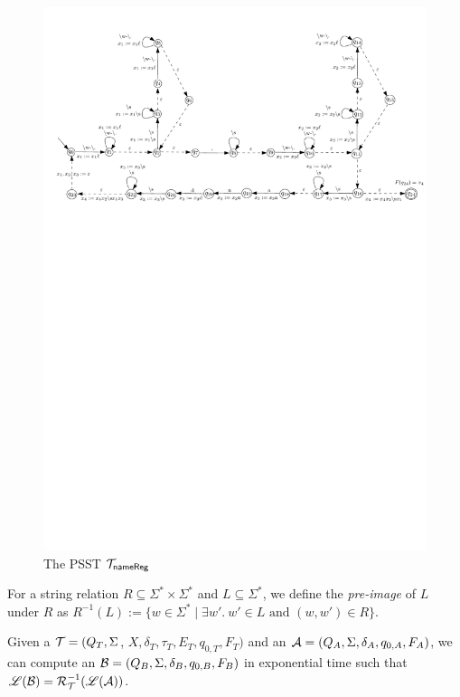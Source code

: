 \begin{example}
\begin{figure}[ht]
\includegraphics[scale=0.8]{psst-epsilon-exmp.pdf}
\caption{The PSST $\mathcal{T}_{\sf nameReg}$}
\label{fig-psst-exmp}
\end{figure}
\end{example}

  
  
\begin{definition}
For a string relation $R \subseteq \Sigma^* \times \Sigma^*$ and $L \subseteq \Sigma^*$, we define the \emph{pre-image} of $L$ under $R$ as $R^{-1}(L):=\{w \in \Sigma^* \mid \exists w'.\ w' \in L \mbox{ and } (w, w') \in R\}$. 
\end{definition}
 
\begin{theorem}
  \label{theorem:psst_preimage}
  Given a \PSST{} $\mathcal{T} = (Q_T, \Sigma$, $X, \delta_T, \tau_T, E_T,  q_{0, T}, F_T)$ and an \FA{} $\mathcal{A}
  = (Q_A, \Sigma, \delta_A, q_{0, A}, F_A)$, we can compute an \FA{} $\mathcal{B} = (Q_B,
  \Sigma, \delta_B, q_{0, B}, F_B)$ in exponential time  such that $\mathscr{L}(\mathcal{B}) = \mathcal{R}^{-1}_{\mathcal{T}}(\mathscr{L}(\mathcal{A}))$.
\end{theorem}

